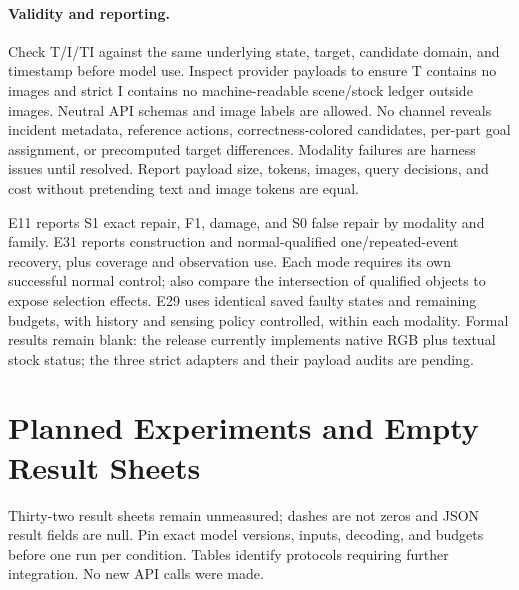 \documentclass[10pt,twocolumn,letterpaper]{article}
\begin{document}
\paragraph{Validity and reporting.}
Check T/I/TI against the same underlying state, target, candidate domain, and timestamp before model use. Inspect provider payloads to ensure T contains no images and strict I contains no machine-readable scene/stock ledger outside images. Neutral API schemas and image labels are allowed. No channel reveals incident metadata, reference actions, correctness-colored candidates, per-part goal assignment, or precomputed target differences. Modality failures are harness issues until resolved. Report payload size, tokens, images, query decisions, and cost without pretending text and image tokens are equal.

E11 reports S1 exact repair, F1, damage, and S0 false repair by modality and family. E31 reports construction and normal-qualified one/repeated-event recovery, plus coverage and observation use. Each mode requires its own successful normal control; also compare the intersection of qualified objects to expose selection effects. E29 uses identical saved faulty states and remaining budgets, with history and sensing policy controlled, within each modality. Formal results remain blank: the release currently implements native RGB plus textual stock status; the three strict adapters and their payload audits are pending.



\onecolumn
\section{Planned Experiments and Empty Result Sheets}
Thirty-two result sheets remain unmeasured; dashes are not zeros and JSON result fields are null. Pin exact model versions, inputs, decoding, and budgets before one run per condition. Tables identify protocols requiring further integration. No new API calls were made.


\clearpage

\clearpage

\clearpage

\clearpage

\clearpage

\clearpage

\clearpage

\clearpage

\clearpage

\clearpage

\clearpage
\onecolumn
\end{document}
